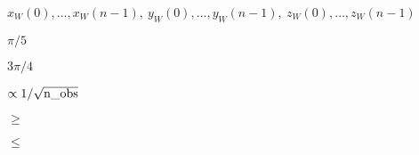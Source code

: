 \documentclass[12pt,twoside]{article}
\providecommand{\facname}{}%
\providecommand{\FACNAME}{}%
\def\lthtmlcheckvsize{\ifdim\ht\sizebox<\vsize 
  \ifdim\wd\sizebox<\hsize\expandafter\hfill\fi \expandafter\vfill
  \else\expandafter\vss\fi}%
\begin{document}
{\newpage\clearpage
{}%
$x_W(0),\ldots,x_W(n-1),\ y_W(0),\ldots,y_W(n-1),\
                   z_W(0),\ldots,z_W(n-1)$%
\lthtmlindisplaymathZ
\lthtmlcheckvsize\clearpage}

\stepcounter{section}

\renewcommand{\facname}{{query\_disc }}

\renewcommand{\FACNAME}{{QUERY\_DISC }}
\stepcounter{section}

\renewcommand{\facname}{{query\_polygon }}

\renewcommand{\FACNAME}{{QUERY\_POLYGON }}
\stepcounter{section}

\renewcommand{\facname}{{query\_strip }}

\renewcommand{\FACNAME}{{QUERY\_STRIP }}
\stepcounter{section}
{\newpage\clearpage
{}%
$\pi/5$%
\lthtmlindisplaymathZ
\lthtmlcheckvsize\clearpage}

{\newpage\clearpage
{}%
$3\pi/4$%
\lthtmlindisplaymathZ
\lthtmlcheckvsize\clearpage}


\renewcommand{\facname}{{query\_triangle }}

\renewcommand{\FACNAME}{{QUERY\_TRIANGLE }}
\stepcounter{section}

\renewcommand{\facname}{{read\_fits\_cut4 }}

\renewcommand{\FACNAME}{{READ\_FITS\_CUT4 }}
\stepcounter{section}
{\newpage\clearpage
{}%
$\propto 1/\sqrt{{\rm n\_obs}}$%
\lthtmlindisplaymathZ
\lthtmlcheckvsize\clearpage}


\renewcommand{\facname}{{read\_fits\_map }}

\renewcommand{\FACNAME}{{READ\_FITS\_MAP }}
\stepcounter{section}
{\newpage\clearpage
{}%
$\ge$%
\lthtmlindisplaymathZ
\lthtmlcheckvsize\clearpage}


\renewcommand{\facname}{{read\_fits\_s }}

\renewcommand{\FACNAME}{{READ\_FITS\_S }}
\stepcounter{section}

\renewcommand{\facname}{{read\_tqu }}

\renewcommand{\FACNAME}{{READ\_TQU }}
\stepcounter{section}
{\newpage\clearpage
{}%
$\le$%
\lthtmlindisplaymathZ
\lthtmlcheckvsize\clearpage}
\end{document}
